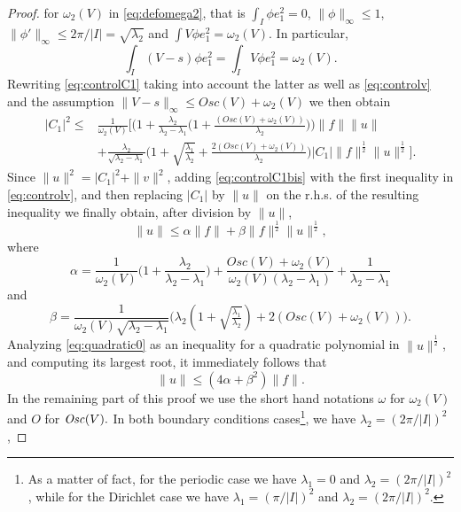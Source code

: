 \documentclass[12pt]{article}
\begin{document}
\begin{proof}
for $\omega_2(V)$ in 
\eqref{eq:defomega2}, that is $\int_I \phi e_1^2 = 0$,
$\|\phi\|_\infty \leq 1$, $\|\phi'\|_\infty  \leq 2\pi/|I|=\sqrt{\lambda_2}$ and 
$\int V \phi e_1^2 = \omega_2(V).$
In particular,
$$
\int_I (V-s)\phi e_1^2 = \int_I V \phi e_1^2 = \omega_2(V).
$$
Rewriting \eqref{eq:controlC1} taking into account the latter as well as 
\eqref{eq:controlv} and the assumption $\|V-s\|_\infty \leq Osc(V) +\omega_2(V)$ 
we then obtain 
\begin{equation}\label{eq:controlC1bis}\begin{split}
	|C_1|^2 \leq & \frac{1}{\omega_2(V)}\Bigg[ \Big( 1 + 
	\frac{\lambda_2}{\lambda_2-\lambda_1}\big(1 + \frac{(
	Osc(V) + \omega_2(V))}{\lambda_2}\big)\Big)
	\|f\| \|u\|\\
	& + \frac{\lambda_2}{\sqrt{\lambda_2-\lambda_1}}\Big(1 +
	\sqrt{\frac{\lambda_1}{\lambda_2}} + \frac{2(Osc(V) + \omega_2(V))}{\lambda_2}\Big)
	|C_1| \|f\|^\frac12 \|u\|^\frac12 \Bigg]. 
\end{split}
\end{equation} 
Since $\|u\|^2 = |C_1|^2 + \|v\|^2$, adding \eqref{eq:controlC1bis} with 
the first inequality in \eqref{eq:controlv}, and then replacing $|C_1|$ by $\|u\|$ on the
r.h.s. of the resulting inequality we finally obtain, after division by $\|u\|$, 
\begin{equation}\label{eq:quadratic0}
\|u\| \leq \alpha \|f\| + \beta \|f\|^\frac12 \|u\|^\frac12,
\end{equation}
where
$$
\alpha = \frac{1}{\omega_2(V)}\Big( 1 + 
    \frac{\lambda_2}{\lambda_2- \lambda_1}\Big) + \frac{Osc(V) + \omega_2(V)}{\omega_2(V)
    (\lambda_2 - \lambda_1)} +\frac{1}{\lambda_2 - \lambda_1} 
$$
and
$$
\beta = \frac{1}{\omega_2(V) \sqrt{\lambda_2-\lambda_1}} \Big(\lambda_2(1 +
	\sqrt{\tfrac{\lambda_1}{\lambda_2}})  + 2(Osc(V) + \omega_2(V))\Big).
$$
Analyzing \eqref{eq:quadratic0} as an inequality for a quadratic polynomial in
$\|u\|^\frac{1}{2}$, and computing its largest root, it immediately follows 
that  
\begin{equation}\label{eq:case2}
\|u\| \leq (4\alpha + \beta^2) \|f\|.
\end{equation}
In the remaining part of this proof we use the short hand notations $\omega$ for
$\omega_2(V)$ and $O$ for ${\it Osc}(V).$ In both boundary conditions 
cases\footnote{As a matter of fact, for the periodic case we have 
$\lambda_1=0$ and $\lambda_2=(2\pi/|I|)^2$, while for the Dirichlet case we 
have $\lambda_1=(\pi/|I|)^2$ and $\lambda_2=(2\pi/|I|)^2$.}, we have $\lambda_2 = (2\pi/|I|)^2$,

\end{proof}
\end{document}
